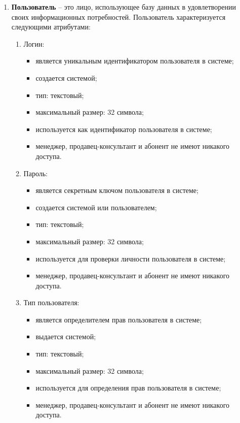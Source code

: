 \begin{enumerate}
    \item \textbf{Пользователь} -- это лицо, использующее базу данных в удовлетворении своих информационных потребностей. Пользователь характеризуется следующими атрибутами:
    \begin{enumerate}
        \item Логин:
        \begin{itemize}
            \item является уникальным идентификатором пользователя в системе;
            \item создается системой;
            \item тип: текстовый;
            \item максимальный размер: 32 символа;
            \item используется как идентификатор пользователя в системе;
            \item менеджер, продавец-консультант и абонент не имеют никакого доступа.
        \end{itemize}

        \item Пароль:
        \begin{itemize}
            \item является секретным ключом пользователя в системе;
            \item создается системой или пользователем;
            \item тип: текстовый;
            \item максимальный размер: 32 символа;
            \item используется для проверки личности пользователя в системе;
            \item менеджер, продавец-консультант и абонент не имеют никакого доступа.
        \end{itemize}

        \item Тип пользователя:
        \begin{itemize}
            \item является определителем прав пользователя в системе;
            \item выдается системой;
            \item тип: текстовый;
            \item максимальный размер: 32 символа;
            \item используется для определения прав пользователя в системе;
            \item менеджер, продавец-консультант и абонент не имеют никакого доступа.
        \end{itemize}
    \end{enumerate}
\end{enumerate}


